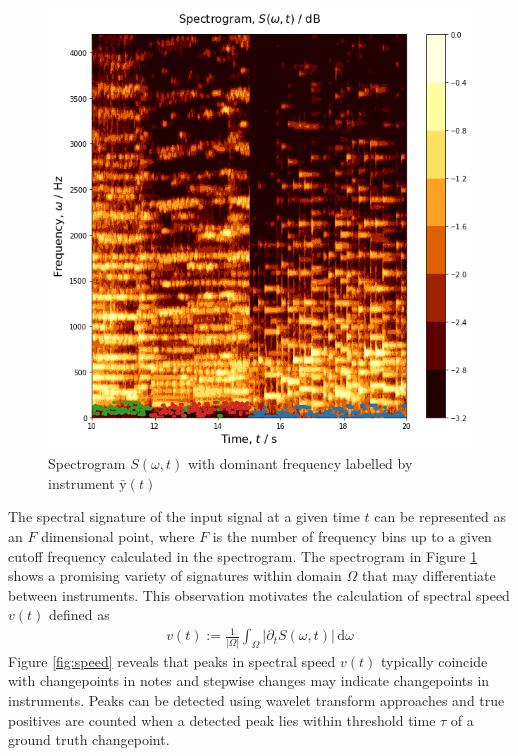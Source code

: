 \documentclass{article}[12pt]
\numberwithin{equation}{section}
\begin{document}
\begin{figure}[H]
\centering{}
\captionsetup{justification=centering}
\includegraphics[scale=0.5]{spectrogram}
\caption{
Spectrogram $S(\omega,t)$ with dominant frequency labelled by instrument $\bar{\mathrm{y}}(t)$
}
\label{fig:spectrogram}
\end{figure}\noindent
The spectral signature of the input signal at a given time $t$ can be
represented as an $F$ dimensional point, where $F$ is the number
of frequency bins up to a given cutoff frequency calculated in the
spectrogram. The spectrogram in Figure \ref{fig:spectrogram} shows a
promising variety of signatures within domain $\Omega$ that may differentiate between instruments.
This observation motivates the calculation of spectral speed $v(t)$ defined as
\begin{align}
	v(t):= \frac{1}{|\Omega|}\int_{\Omega}\!\big|\partial_tS(\omega,t)\big|\,\mathrm{d}\omega
\end{align}
Figure \ref{fig:speed} reveals that peaks in spectral speed $v(t)$ typically
coincide with changepoints in notes and stepwise changes may indicate changepoints
in instruments. Peaks can be detected using wavelet transform approaches \cite{Du2006}
and true positives are counted when a detected peak lies within threshold time $\tau$
of a ground truth changepoint.
\end{document}
